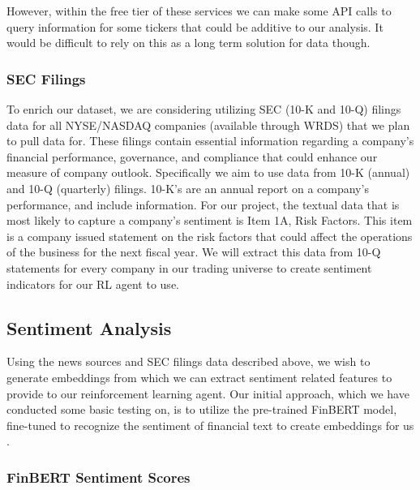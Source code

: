 However, within the free tier of these services we can make some API calls to 
query information for some tickers that could be additive to our analysis. It would
be difficult to rely on this as a long term solution for data though.

\subsubsection{SEC Filings}

To enrich our dataset, we are considering utilizing SEC (10-K and 10-Q) filings data for all 
NYSE/NASDAQ companies (available through WRDS) that we plan to pull data for. 
These filings contain essential information regarding a company's financial 
performance, governance, and compliance that could enhance our measure of 
company outlook. Specifically we aim to use data from 10-K (annual) and 10-Q (quarterly) filings. 
10-K’s are an annual report on a company’s performance, and include information. 
For our project, the textual data that is most likely to 
capture a company’s sentiment is Item 1A, Risk Factors. This item is a company 
issued statement on the risk factors that could affect the operations of the 
business for the next fiscal year. We will extract this data from 10-Q statements 
for every company in our trading universe to create sentiment indicators for our 
RL agent to use. 

\subsection{Sentiment Analysis}

Using the news sources and SEC filings data described above, we wish to 
generate embeddings from which we can extract sentiment related features 
to provide to our reinforcement learning agent. Our initial approach, which 
we have conducted some basic testing on, is to utilize the pre-trained 
FinBERT model, fine-tuned to recognize the sentiment of financial text to 
create embeddings for us \cite{finbert}. 

\subsubsection{FinBERT Sentiment Scores}

